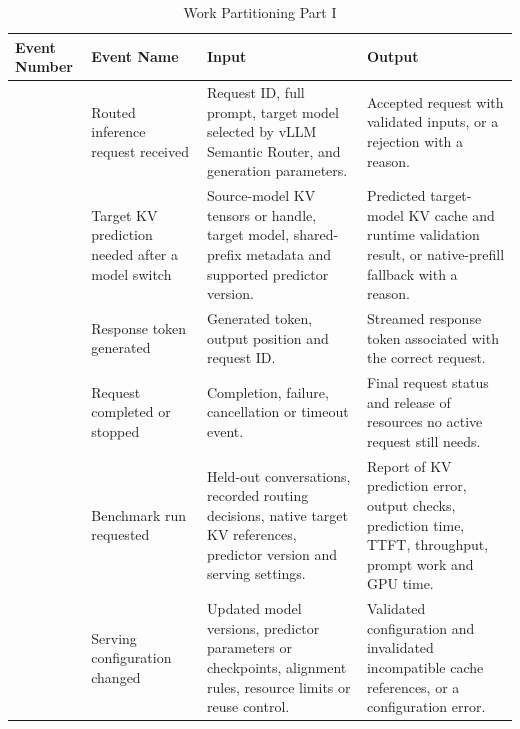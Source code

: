 \documentclass[12pt]{article}
\begin{document}
\begingroup
\small
\setlength{\tabcolsep}{4pt}
\renewcommand{\arraystretch}{1.18}
\begin{longtable}{|>{\centering\arraybackslash}p{}|>{\centering\arraybackslash}p{}|>{\centering\arraybackslash}p{}|>{\centering\arraybackslash}p{}|}
\caption{Work Partitioning Part I}\label{tab:work-partitioning-inputs}\\
\hline
\textbf{Event Number} & \textbf{Event Name} & \textbf{Input} & \textbf{Output}\\
\hline
\endhead
1 & Routed inference request received & Request ID, full prompt, target model selected by vLLM Semantic Router, and generation parameters. & Accepted request with validated inputs, or a rejection with a reason.\\
\hline
2 & Target KV prediction needed after a model switch & Source-model KV tensors or handle, target model, shared-prefix metadata and supported predictor version. & Predicted target-model KV cache and runtime validation result, or native-prefill fallback with a reason.\\
\hline
3 & Response token generated & Generated token, output position and request ID. & Streamed response token associated with the correct request.\\
\hline
4 & Request completed or stopped & Completion, failure, cancellation or timeout event. & Final request status and release of resources no active request still needs.\\
\hline
5 & Benchmark run requested & Held-out conversations, recorded routing decisions, native target KV references, predictor version and serving settings. & Report of KV prediction error, output checks, prediction time, TTFT, throughput, prompt work and GPU time.\\
\hline
6 & Serving configuration changed & Updated model versions, predictor parameters or checkpoints, alignment rules, resource limits or reuse control. & Validated configuration and invalidated incompatible cache references, or a configuration error.\\
\hline
\end{longtable}
\end{document}
